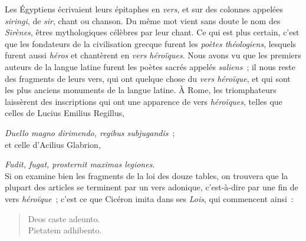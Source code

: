 \documentclass[french,twoside]{book} %
\begin{document}
Les Égyptiens écrivaient leurs épitaphes en {\itshape vers}, et sur des colonnes appelées {\itshape siringi}, de {\itshape sir}, chant ou chanson. Du même mot vient sans doute le nom des {\itshape Sirènes}, êtres mythologiques célèbres par leur chant. Ce qui est plus certain, c’est que les fondateurs de la civilisation grecque furent les {\itshape poètes théologiens}, lesquels furent aussi {\itshape héros} et chantèrent en {\itshape vers héroïques}. Nous avons vu que les premiers auteurs de la langue latine furent les poètes sacrés appelés {\itshape saliens} ; il nous reste des fragments de leurs vers, qui ont quelque chose du {\itshape vers héroïque}, et qui sont les plus anciens monuments de la langue latine. À Rome, les triomphateurs laissèrent des inscriptions qui ont une apparence de vers {\itshape héroïques}, telles que celles de Lucius Emilius Regillus,\par

{\itshape Duello magno dirimendo, regibus subjugandis} ;\\

\noindent et celle d’Acilius Glabrion,\par

{\itshape Fudit, fugat, prosternit maximas legiones}.\\

\noindent Si on examine bien les fragments de la loi des douze  tables, on trouvera que la plupart des articles se terminent par un vers adonique, c’est-à-dire par une fin de vers {\itshape héroïque} ; c’est ce que Cicéron imita dans ses {\itshape Lois}, qui commencent ainsi :\par


\begin{verse}
Deos caste adeunto.\\
Pietatem adhibento.\\
\end{verse}
\end{document}
